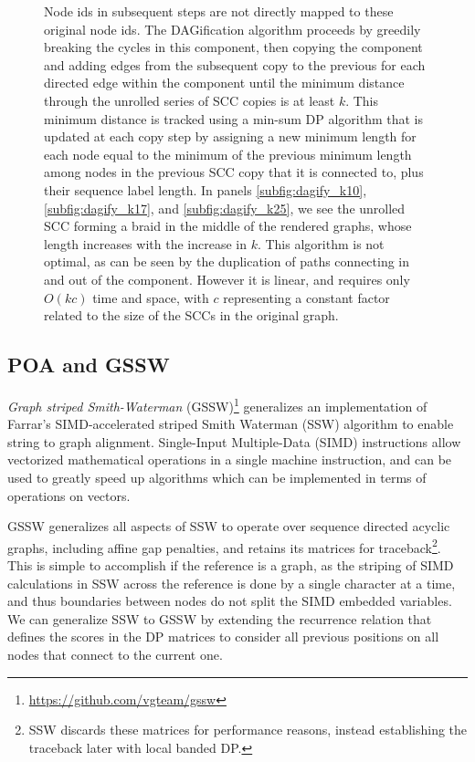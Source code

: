 \documentclass[a4paper,12pt,numbered,oneside]{Classes/PhDThesisPSnPDF}
\providecommand{\DIFaddbegin}{} %
\providecommand{\DIFaddend}{} %
\providecommand{\DIFaddendFL}{} %
\begin{document}
\begin{figure}[htbp!]
{{    Node ids in subsequent steps are not directly mapped to these original node ids.
    The DAGification algorithm proceeds by greedily breaking the cycles in this component, then copying the component and adding edges from the subsequent copy to the previous for each directed edge within the component until the minimum distance through the unrolled series of SCC copies is at least $k$.
    This minimum distance is tracked using a min-sum DP algorithm that is updated at each copy step by assigning a new minimum length for each node equal to the minimum of the previous minimum length among nodes in the previous SCC copy that it is connected to, plus their sequence label length.
    In panels \ref{subfig:dagify_k10}, \ref{subfig:dagify_k17}, and \ref{subfig:dagify_k25}, we see the unrolled SCC forming a braid in the middle of the rendered graphs, whose length increases with the increase in $k$.
    This algorithm is not optimal, as can be seen by the duplication of paths connecting in and out of the component.
    However it is linear, and requires only $O(kc)$ time and space, with $c$ representing a constant factor related to the size of the SCCs in the original graph.
  }\DIFaddendFL }
\label{fig:dagify}
\end{figure}

\subsection{POA and GSSW}
\DIFaddbegin \label{sec:gssw}
\DIFaddend %

\emph{Graph striped Smith-Waterman} (GSSW)\footnote{\url{https://github.com/vgteam/gssw}} generalizes an implementation \cite{zhao2013ssw} of Farrar's SIMD-accelerated striped Smith Waterman (SSW) algorithm \cite{farrar2007striped} to enable string to graph alignment.
Single-Input Multiple-Data (SIMD) instructions allow vectorized mathematical operations in a single machine instruction, and can be used to greatly speed up algorithms which can be implemented in terms of operations on vectors.

GSSW generalizes all aspects of SSW to operate over sequence directed acyclic graphs, including affine gap penalties, and retains its matrices for traceback\footnote{SSW discards these matrices for performance reasons, instead establishing the traceback later with local banded DP.}.
This is simple to accomplish if the reference is a graph, as the striping of SIMD calculations in SSW across the reference is done by a single character at a time, and thus boundaries between nodes do not split the SIMD embedded variables.
We can generalize SSW to GSSW by extending the recurrence relation that defines the scores in the DP matrices to consider all previous positions on all nodes that connect to the current one.
\end{document}
